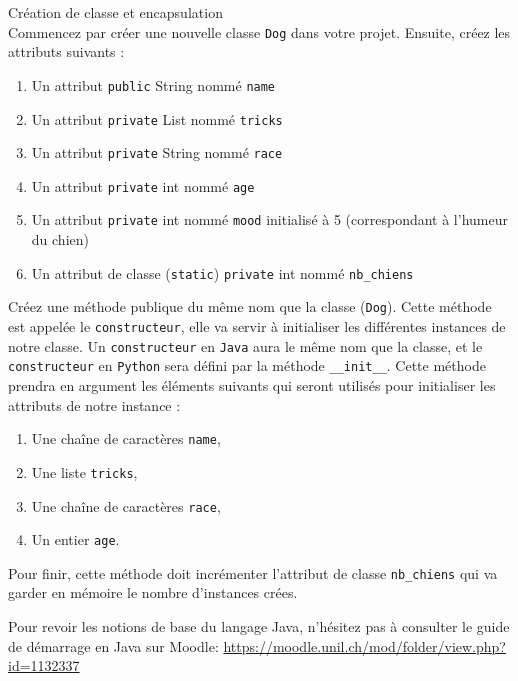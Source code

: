 \begin{Exercice}[10 minutes] Création de classe et encapsulation\\
    Commencez par créer une nouvelle classe \lstinline{Dog} dans votre projet. Ensuite, créez les attributs suivants :
    \begin{enumerate}
    \item Un attribut \lstinline{public} String nommé \lstinline{name}
    \item Un attribut \lstinline{private} List nommé \lstinline{tricks}
    \item Un attribut \lstinline{private} String nommé \lstinline{race}
    \item Un attribut \lstinline{private} int nommé \lstinline{age}
    \item Un attribut \lstinline{private} int nommé \lstinline{mood} initialisé à 5 (correspondant à l'humeur du chien)
    \item Un attribut de classe (\lstinline{static}) \lstinline{private} int nommé \lstinline{nb_chiens}
   	\end{enumerate}
   	
   	Créez une méthode publique du même nom que la classe (\lstinline{Dog}). Cette méthode est appelée le \lstinline{constructeur}, elle va servir à initialiser les différentes instances de notre classe. Un \lstinline{constructeur} en \lstinline{Java} aura le même nom que la classe, et le \lstinline{constructeur} en \lstinline{Python} sera défini par la méthode \lstinline{__init__}. Cette méthode prendra en argument les éléments suivants qui seront utilisés pour initialiser les attributs de notre instance :
   	\begin{enumerate}
    \item Une chaîne de caractères \lstinline{name},
    \item Une liste \lstinline{tricks},
    \item Une chaîne de caractères \lstinline{race},
    \item Un entier \lstinline{age}.
   	\end{enumerate}
   	
   	Pour finir, cette méthode doit incrémenter l'attribut de classe \lstinline{nb_chiens} qui va garder en mémoire le nombre d'instances crées.
   	
\begin{conseil}
    Pour revoir les notions de base du langage Java, n'hésitez pas à consulter le guide de démarrage en Java sur Moodle:
	\url{https://moodle.unil.ch/mod/folder/view.php?id=1132337}


\end{conseil}
\end{Exercice}
